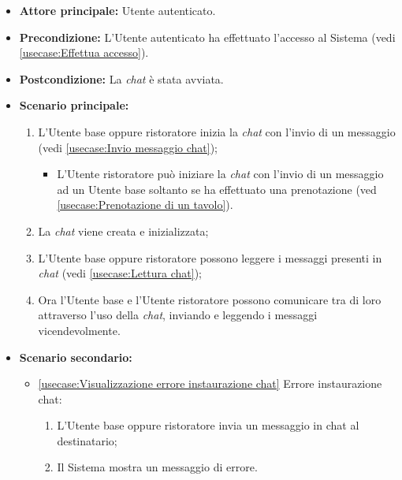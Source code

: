 \label{usecase:Comunicazione attraverso chat}
\begin{itemize}
	\item \textbf{Attore principale:} Utente autenticato.

	\item \textbf{Precondizione:} L'Utente autenticato ha effettuato l'accesso al Sistema (vedi \autoref{usecase:Effettua accesso}).

	\item \textbf{Postcondizione:} La \textit{chat} è stata avviata.

	\item \textbf{Scenario principale:}
	      \begin{enumerate}
		      \item L'Utente base oppure ristoratore inizia la \textit{chat} con l'invio di un messaggio (vedi \autoref{usecase:Invio messaggio chat});
		            \begin{itemize}
			            \item L'Utente ristoratore può iniziare la \textit{chat} con l'invio di un messaggio ad un Utente base soltanto se ha effettuato una prenotazione (ved \autoref{usecase:Prenotazione di un tavolo}).
		            \end{itemize}
		      \item La \textit{chat} viene creata e inizializzata;
		      \item L'Utente base oppure ristoratore possono leggere i messaggi presenti in \textit{chat} (vedi \autoref{usecase:Lettura chat});
		      \item Ora l'Utente base e l'Utente ristoratore possono comunicare tra di loro attraverso l'uso della \textit{chat}, inviando e leggendo i messaggi vicendevolmente.
	      \end{enumerate}

	\item \textbf{Scenario secondario:}
	      \begin{itemize}
		      \item \autoref{usecase:Visualizzazione errore instaurazione chat} Errore instaurazione chat:
		            \begin{enumerate}
			            \item L'Utente base oppure ristoratore invia un messaggio in chat al destinatario;
			            \item Il Sistema mostra un messaggio di errore.
		            \end{enumerate}
	      \end{itemize}
\end{itemize}


